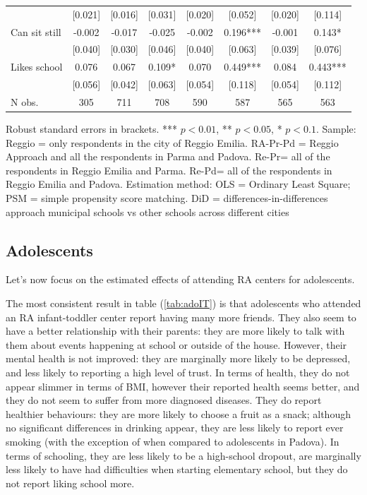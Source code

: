 \documentclass[12pt]{article}
\begin{document}
\begin{table}[ht]
\begin{center}
\begin{adjustbox}{width=1.2\textwidth,center=\textwidth}
\begin{tabular}{lccccccc}
 & [0.021] & [0.016] & [0.031] & [0.020] & [0.052] & [0.020] & [0.114]\\
{Can sit still } & {-0.002 } & {-0.017 } & {-0.025 } & {-0.002 } & {0.196{*}{*}{*} } & {-0.001 } & {0.143{*} }\\
 & [0.040] & [0.030] & [0.046] & [0.040] & [0.063] & [0.039] & [0.076]\\
{Likes school } & {0.076 } & {0.067 } & {0.109{*} } & {0.070 } & {0.449{*}{*}{*} } & {0.084 } & {0.443{*}{*}{*} }\\
 & [0.056] & [0.042] & [0.063] & [0.054] & [0.118] & [0.054] & [0.112]\\
\hline 
{N obs. } & {305 } & {711 } & {708 } & {590 } & {587 } & {565 } & {563 }\\
\hline 
\end{tabular}
\end{adjustbox}
\end{center}

\begin{footnotesize}
\raggedright{Robust standard errors in brackets. *** $p<0.01$, ** $p<0.05$, * $p<0.1$. Sample: Reggio = only respondents in the city of Reggio Emilia. RA-Pr-Pd = Reggio Approach and all the respondents in Parma and Padova. Re-Pr= all of the respondents in Reggio Emilia and Parma. Re-Pd= all of the respondents in Reggio Emilia and Padova. Estimation method: OLS = Ordinary Least Square; PSM = simple propensity score matching. DiD = differences-in-differences approach municipal schools vs other schools across different cities}
\end{footnotesize}
\end{table}

\subsection{Adolescents}
Let's now focus on the estimated effects of attending RA centers for adolescents.

The most consistent result in table (\ref{tab:adoIT}) is that adolescents who attended an RA infant-toddler center report having many more friends. They also seem to have a better relationship with their parents: they are more likely to talk with them about events happening at school or outside of the house. However, their mental health is not improved: they are marginally more likely to be depressed, and less likely to reporting a high level of trust.
In terms of health, they do not appear slimmer in terms of BMI, however their reported health seems better, and they do not seem to suffer from more diagnosed diseases. They do report healthier behaviours: they are more likely to choose a fruit as a snack; although no significant differences in drinking appear, they are less likely to report ever smoking (with the exception of when compared to adolescents in Padova). 
In terms of schooling, they are less likely to be a high-school dropout, are marginally less likely to have had difficulties when starting elementary school, but they do not report liking school more.
\end{document}
